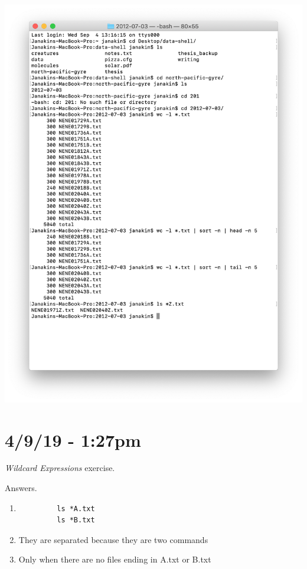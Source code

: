 \documentclass{article}
\begin{document}
\includegraphics[width=\textwidth]{figl.png}

\section*{4/9/19 - 1:27pm}

\textit{Wildcard Expressions} exercise.

Answers.

\begin{enumerate}
    \item \begin{verbatim}
         ls *A.txt
         ls *B.txt
    \end{verbatim}
    \item They are separated because they are two commands
    \item Only when there are no files ending in A.txt or B.txt
\end{enumerate}
\end{document}
